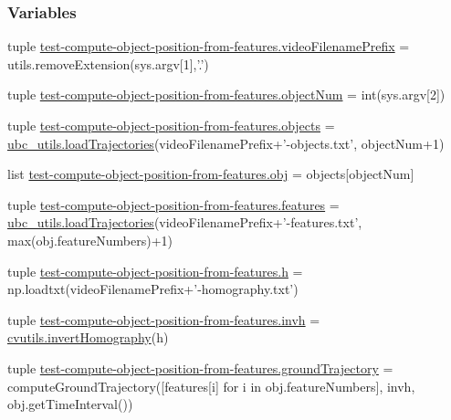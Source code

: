 \subsubsection*{Variables}
\begin{DoxyCompactItemize}
\item 
tuple \hyperlink{namespacetest-compute-object-position-from-features_adc698cf7dcc144504b814a49b1ab2d03}{test-\/compute-\/object-\/position-\/from-\/features.\-video\-Filename\-Prefix} = utils.\-remove\-Extension(sys.\-argv\mbox{[}1\mbox{]},'.')
\item 
tuple \hyperlink{namespacetest-compute-object-position-from-features_a3f91c49cda8f4488c79a71428bb71944}{test-\/compute-\/object-\/position-\/from-\/features.\-object\-Num} = int(sys.\-argv\mbox{[}2\mbox{]})
\item 
tuple \hyperlink{namespacetest-compute-object-position-from-features_a5541d2d8d35cc1a07f40cf268806cdcd}{test-\/compute-\/object-\/position-\/from-\/features.\-objects} = \hyperlink{namespaceubc__utils_a24596344ca92b512a6ba25e79fca2214}{ubc\-\_\-utils.\-load\-Trajectories}(video\-Filename\-Prefix+'-\/objects.\-txt', object\-Num+1)
\item 
list \hyperlink{namespacetest-compute-object-position-from-features_ae7b665ad8f0a66799e0a33283b39ca61}{test-\/compute-\/object-\/position-\/from-\/features.\-obj} = objects\mbox{[}object\-Num\mbox{]}
\item 
tuple \hyperlink{namespacetest-compute-object-position-from-features_ae8615fa1af68357d5dbde0a7aa24dc80}{test-\/compute-\/object-\/position-\/from-\/features.\-features} = \hyperlink{namespaceubc__utils_a24596344ca92b512a6ba25e79fca2214}{ubc\-\_\-utils.\-load\-Trajectories}(video\-Filename\-Prefix+'-\/features.\-txt', max(obj.\-feature\-Numbers)+1)
\item 
tuple \hyperlink{namespacetest-compute-object-position-from-features_aa814e45c0ebdd0c97a3015ed28c7f157}{test-\/compute-\/object-\/position-\/from-\/features.\-h} = np.\-loadtxt(video\-Filename\-Prefix+'-\/homography.\-txt')
\item 
tuple \hyperlink{namespacetest-compute-object-position-from-features_a91e8c535f131b475fb00ee81e203a1a5}{test-\/compute-\/object-\/position-\/from-\/features.\-invh} = \hyperlink{namespacecvutils_a0c2c4574d510683c40ddb323f588e10d}{cvutils.\-invert\-Homography}(h)
\item 
tuple \hyperlink{namespacetest-compute-object-position-from-features_aa2700a45eb5168455d0feb3a5a2f24eb}{test-\/compute-\/object-\/position-\/from-\/features.\-ground\-Trajectory} = compute\-Ground\-Trajectory(\mbox{[}features\mbox{[}i\mbox{]} for i in obj.\-feature\-Numbers\mbox{]}, invh, obj.\-get\-Time\-Interval())

\end{DoxyCompactItemize}
